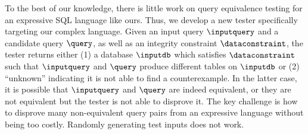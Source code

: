 To the best of our knowledge, there is little work on query equivalence testing for an expressive SQL language like ours. Thus, we develop a new tester specifically targeting our complex language. 
Given an input query $\inputquery$ and a candidate query $\query$, as well as an integrity constraint $\dataconstraint$, the tester returns either (1) a database $\inputdb$ which satisfies $\dataconstraint$ such that $\inputquery$ and $\query$ produce different tables on $\inputdb$ or (2) ``unknown'' indicating it is not able to find a counterexample. 
In the latter case, it is possible that $\inputquery$ and $\query$ are indeed equivalent, or they are not equivalent but the tester is not able to disprove it. The key challenge is how to  disprove many non-equivalent query pairs from an expressive language without being too costly. 
Randomly generating test inputs does not work.

